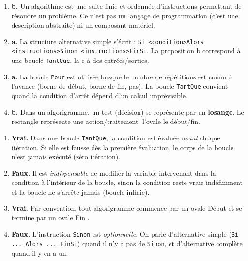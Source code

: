 \documentclass[11pt]{article}
\begin{document}
\begin{corrige}
\begin{enumerate}
\item \textbf{b.} Un algorithme est une suite finie et ordonnée d'instructions permettant de résoudre un problème. Ce n'est pas un langage de programmation (c'est une description abstraite) ni un composant matériel.
\item \textbf{a.} La structure alternative simple s'écrit : \texttt{Si \textless condition\textgreater Alors \textless instructions\textgreater Sinon \textless instructions\textgreater FinSi}. La proposition b correspond à une boucle \texttt{TantQue}, la c à des entrées/sorties.
\item \textbf{a.} La boucle \texttt{Pour} est utilisée lorsque le nombre de répétitions est connu à l'avance (borne de début, borne de fin, pas). La boucle \texttt{TantQue} convient quand la condition d'arrêt dépend d'un calcul imprévisible.
\item \textbf{b.} Dans un algorigramme, un test (décision) se représente par un \textbf{losange}. Le rectangle représente une action/traitement, l'ovale le début/fin.
\end{enumerate}
\end{corrige}

\begin{corrige}
\begin{enumerate}
\item \textbf{Vrai.} Dans une boucle \texttt{TantQue}, la condition est évaluée \emph{avant} chaque itération. Si elle est fausse dès la première évaluation, le corps de la boucle n'est jamais exécuté (zéro itération).
\item \textbf{Faux.} Il est \emph{indispensable} de modifier la variable intervenant dans la condition à l'intérieur de la boucle, sinon la condition reste vraie indéfiniment et la boucle ne s'arrête jamais (boucle infinie).
\item \textbf{Vrai.} Par convention, tout algorigramme commence par un ovale \og Début \fg{} et se termine par un ovale \og Fin \fg{}.
\item \textbf{Faux.} L'instruction \texttt{Sinon} est \emph{optionnelle}. On parle d'alternative simple (\texttt{Si ... Alors ... FinSi}) quand il n'y a pas de \texttt{Sinon}, et d'alternative complète quand il y en a un.
\end{enumerate}
\end{corrige}
\end{document}
